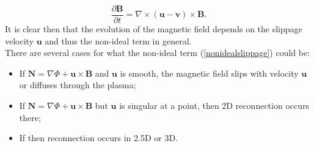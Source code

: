 \begin{equation}
    \frac{\partial\mathbf{B}}{\partial t} = \nabla \times (\mathbf{u}-\mathbf{v})\times\mathbf{B}.
\end{equation}
It is clear then that the evolution of the magnetic field depends on the slippage velocity $\mathbf{u}$ and thus the non-ideal term in general. \\
There are several cases for what the non-ideal term (\ref{nonidealslippage}) could be:
\begin{itemize}
    \item If $\mathbf{N} = \nabla\Phi + \mathbf{u}\times\mathbf{B}$ and $\mathbf{u}$ is smooth, the magnetic field slips with velocity $\mathbf{u}$ or diffuses through the plasma;
    \item If $\mathbf{N} = \nabla\Phi + \mathbf{u}\times\mathbf{B}$ but $\mathbf{u}$ is singular at a point, then 2D reconnection occurs there;
    \item If then reconnection occurs in 2.5D or 3D.
\end{itemize}